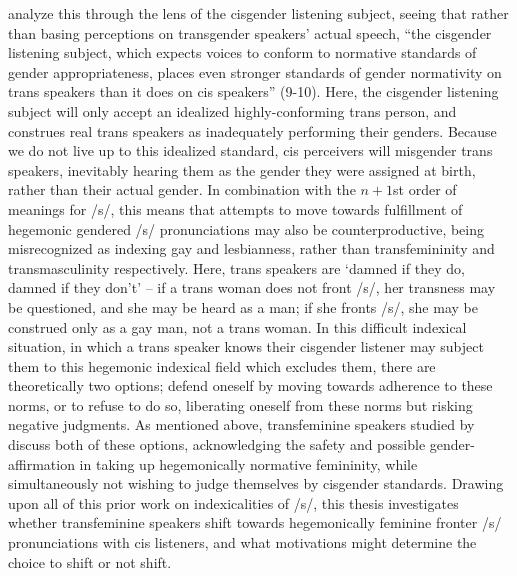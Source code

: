 \documentclass[12pt,twoside]{reedthesis}
\begin{document}
\textcite{jessee_cisgender_2025} analyze this through the lens of the cisgender listening subject, seeing that rather than basing perceptions on transgender speakers' actual speech, ``the cisgender listening subject, which expects voices to conform to normative standards of gender appropriateness, places even stronger standards of gender normativity on trans speakers than it does on cis speakers'' (9-10). Here, the cisgender listening subject will only accept an idealized highly-conforming trans person, and construes real trans speakers as inadequately performing their genders. Because we do not live up to this idealized standard, cis perceivers will misgender trans speakers, inevitably hearing them as the gender they were assigned at birth, rather than their actual gender. In combination with the $n + 1$st order of meanings for /s/, this means that attempts to move towards fulfillment of hegemonic gendered /s/ pronunciations may also be counterproductive, being misrecognized as indexing gay and lesbianness, rather than transfemininity and transmasculinity respectively. Here, trans speakers are `damned if they do, damned if they don't' -- if a trans woman does not front /s/, her transness may be questioned, and she may be heard as a man; if she fronts /s/, she may be construed only as a gay man, not a trans woman. %
In this difficult indexical situation, in which a trans speaker knows their cisgender listener may subject them to this hegemonic indexical field which excludes them, there are theoretically two options; defend oneself by moving towards adherence to these norms, or to refuse to do so, liberating oneself from these norms but risking negative judgments. As mentioned above, transfeminine speakers studied by \textcite{heffernan_constructing_2023} discuss both of these options, acknowledging the safety and possible gender-affirmation in taking up hegemonically normative femininity, while simultaneously not wishing to judge themselves by cisgender standards. Drawing upon all of this prior work on indexicalities of /s/, this thesis investigates whether transfeminine speakers shift towards hegemonically feminine fronter /s/ pronunciations with cis listeners, and what motivations might determine the choice to shift or not shift.
\end{document}
